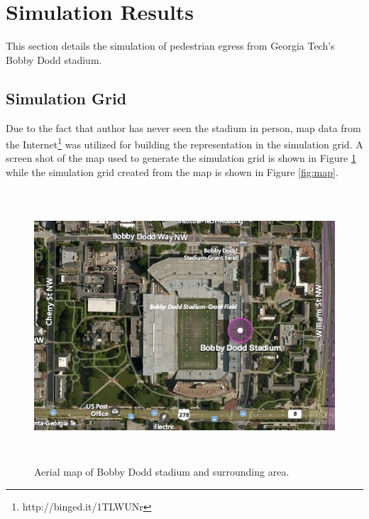 \documentclass[paper=a4, fontsize=11pt]{scrartcl}
\numberwithin{equation}{section}		%
\numberwithin{figure}{section}			%
\numberwithin{table}{section}		    %
\begin{document}
\section{Simulation Results}
This section details the simulation of pedestrian egress from Georgia Tech's Bobby Dodd stadium. 

\subsection{Simulation Grid}
Due to the fact that author has never seen the stadium in person, map data from the 
Internet\footnote{http://binged.it/1TLWUNr} was utilized for building the representation in the 
simulation grid. A screen shot of the map used to generate the simulation grid is shown in Figure 
\ref{fig:bing} while the simulation grid created from the map is shown in Figure \ref{fig:map}.

\begin{figure}[H]
	\begin{center}
		\includegraphics[height=4in,width=5.5in]{stadium_bing_map} 
		\caption{Aerial map of Bobby Dodd stadium and surrounding area.\label{fig:bing}}
	\end{center} 
\end{figure}
\end{document}
